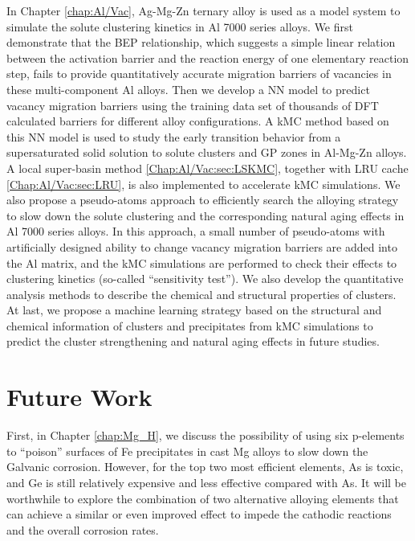 In Chapter \ref{chap:Al/Vac}, Ag-Mg-Zn ternary alloy is used as a model system to simulate the solute clustering kinetics in Al 7000 series alloys. We first demonstrate that the \acf{BEP} relationship, which suggests a simple linear relation between the activation barrier and the reaction energy of one elementary reaction step, fails to provide quantitatively accurate migration barriers of vacancies in these multi-component Al alloys. Then we develop a \ac{NN} model to predict vacancy migration barriers using the training data set of thousands of \ac{DFT} calculated barriers for different alloy configurations. A \ac{kMC} method based on this \ac{NN} model is used to study the early transition behavior from a supersaturated solid solution to solute clusters and \acf{GP} zones in Al-Mg-Zn alloys. A local super-basin method  \ref{Chap:Al/Vac:sec:LSKMC}, together with \ac{LRU} cache \ref{Chap:Al/Vac:sec:LRU}, is also implemented to accelerate \ac{kMC} simulations. We also propose a pseudo-atoms approach to efficiently search the alloying strategy to slow down the solute clustering and the corresponding natural aging effects in Al 7000 series alloys. In this approach, a small number of pseudo-atoms with artificially designed ability to change vacancy migration barriers are added into the Al matrix, and the \ac{kMC} simulations are performed to check their effects to clustering kinetics (so-called ``sensitivity test''). We also develop the quantitative analysis methods to describe the chemical and structural properties of clusters. At last, we propose a machine learning strategy based on the structural and chemical information of clusters and precipitates from \ac{kMC} simulations to predict the cluster strengthening and natural aging effects in future studies.

\section{Future Work}

First, in Chapter \ref{chap:Mg_H}, we discuss the possibility of using six p-elements to ``poison'' surfaces of Fe precipitates in cast Mg alloys to slow down the Galvanic corrosion. However, for the top two most efficient elements, As is toxic, and Ge is still relatively expensive and less effective compared with As. It will be worthwhile to explore the combination of two alternative alloying elements that can achieve a similar or even improved effect to impede the cathodic reactions and the overall corrosion rates.


